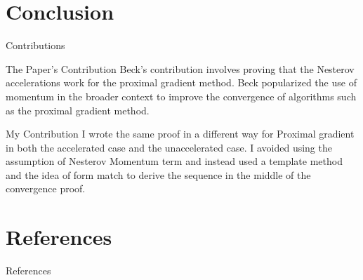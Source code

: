 \documentclass[11pt]{beamer}
\begin{document}
   
\section{Conclusion}
    \begin{frame}{Contributions}
        \begin{block}{The Paper's Contribution}
            Beck's contribution involves proving that the Nesterov accelerations work for the proximal gradient method. Beck popularized the use of momentum in the broader context to improve the convergence of algorithms such as the proximal gradient method.    
        \end{block}
        \begin{block}{My Contribution}
            I wrote the same proof in a different way for Proximal gradient in both the accelerated case and the unaccelerated case. I avoided using the assumption of Nesterov Momentum term and instead used a template method and the idea of form match to derive the sequence in the middle of the convergence proof.     
        \end{block}
    \end{frame}
    
\section{References}
    \begin{frame}{References}
        
        
    \end{frame}
\end{document}
